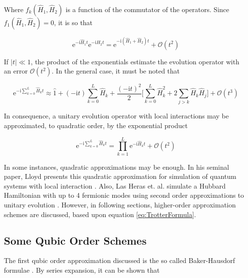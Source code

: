   Where $f_k(\hat{H}_1,\hat{H}_2)$ is a function of the commutator of the operators. Since $f_1(\hat{H}_1,\hat{H}_2) = 0$, it is so that

  \begin{equation}
    \mathrm{e}^{-\mathrm{i}\hat{H}_1 t}\mathrm{e}^{-\mathrm{i}\hat{H}_2 t} = \mathrm{e}^{-\mathrm{i}(\hat{H}_1 + \hat{H}_2) t} + \mathcal{O}(t^2)
    \label{eq:O2Approx}
  \end{equation}

  If $|t| \ll 1$, the product of the exponentials estimate the evolution operator with an error $\mathcal{O}(t^2)$. In the general case, it must be noted that

  \begin{equation}
    \mathrm{e}^{-\mathrm{i}\sum_{k = 0}^L \hat{H}_k t} \approx \hat{1} + (-\mathrm{i}t)\sum_{k = 0}^L \hat{H}_k + \frac{(-\mathrm{i}t)^2}{2} \Bigg[\sum_{k = 0}^L \hat{H}_k^2 + 2 \sum_{j > k}\hat{H}_k \hat{H}_j\Bigg] + \mathcal{O}(t^3)
    \label{eq:TrotterFormula}
  \end{equation}

  In consequence, a unitary evolution operator with local interactions may be approximated, to quadratic order, by the exponential product

  \begin{equation}
    \mathrm{e}^{-\mathrm{i}\sum_{k = 0}^L \hat{H}_k t} = \prod_{k = 1}^{L} \mathrm{e}^{-\mathrm{i}\hat{H}_kt} + \mathcal{O}(t^2)
    \label{eq:2ndOrderTrotter}
  \end{equation}

  In some instances, quadratic approximations may be enough. In his seminal paper, Lloyd presents this quadratic approximation for simulation of quantum systems with local interaction \cite{LloydNature}. Also, Las Heras et. al. simulate a Hubbard Hamiltonian with up to 4 fermionic modes using second order approximations to unitary evolution \cite{HubbardSimul, HubbardSimulLasHeras}. However, in following sections, higher-order approximation schemes are discussed, based upon equation \ref{eq:TrotterFormula}.

  \subsection{Some Qubic Order Schemes}

  The first qubic order approximation discussed is the so called Baker-Hausdorf formulae \cite{Nielsen}. By series expansion, it can be shown that

